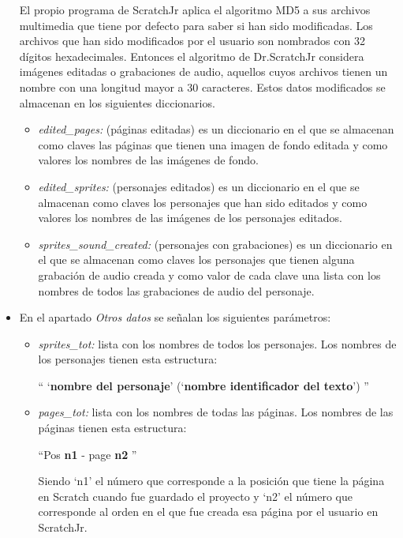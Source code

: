 \documentclass[a4paper, 12pt]{book}
\begin{document}
\begin{itemize}
    \vspace{5mm}
    El propio programa de ScratchJr aplica el algoritmo MD5 a sus archivos multimedia que tiene por defecto para saber si han sido modificadas.
    Los archivos que han sido modificados por el usuario son nombrados con 32 dígitos hexadecimales.
    Entonces el algoritmo de Dr.ScratchJr considera imágenes editadas o grabaciones de audio, aquellos cuyos archivos tienen un nombre con una longitud mayor a 30 caracteres.
    Estos datos modificados se almacenan en los siguientes diccionarios.
     \begin{itemize}
        \item \emph{edited\_pages:} (páginas editadas) es un diccionario en el que se almacenan como claves las páginas que tienen una imagen de fondo editada y como valores los nombres de las imágenes de fondo.
        \item \emph{edited\_sprites:} (personajes editados) es un diccionario en el que se almacenan como claves los personajes que han sido editados y como valores los nombres de las imágenes de los personajes editados.
        \item \emph{sprites\_sound\_created:} (personajes con grabaciones) es un diccionario en el que se almacenan como claves los personajes que tienen alguna grabación de audio creada y como valor de cada clave una lista con los nombres de todos las grabaciones de audio del personaje.
     \end{itemize}
    
    \item En el apartado \emph{Otros datos} se señalan los siguientes parámetros:
     \begin{itemize}
        \item \emph{sprites\_tot:} lista con los nombres de todos los personajes. Los nombres de los personajes tienen esta estructura:
         \begin{center}
            `` `\textbf{nombre del personaje}' (`\textbf{nombre identificador del texto}') ''
         \end{center}

        \item \emph{pages\_tot:} lista con los nombres de todas las páginas.
        Los nombres de las páginas tienen esta estructura:
         \begin{center}
            ``Pos \textbf{n1} - page \textbf{n2} ''
         \end{center}
        Siendo `n1' el número que corresponde a la posición que tiene la página en Scratch cuando fue guardado el proyecto y `n2' el número que corresponde al orden en el que fue creada esa página por el usuario en ScratchJr.


\end{itemize}
\end{itemize}
\end{document}
